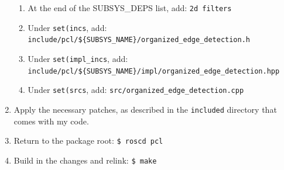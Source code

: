 \documentclass[12pt]{report}
\begin{document}
\begin{sloppypar}
\begin{enumerate}
\begin{enumerate}
\item{At the end of the SUBSYS\_DEPS list, add: \texttt{2d filters}}
\item{Under \texttt{set(incs}, add: \texttt{include\slash pcl\slash \$\{SUBSYS\_NAME\}\slash organized\_edge\_detection.h}}
\item{Under \texttt{set(impl\_incs}, add: \texttt{include\slash pcl\slash \$\{SUBSYS\_NAME\}\slash impl\slash organized\_edge\_detection.hpp}}
\item{Under \texttt{set(srcs}, add: \texttt{src/organized\_edge\_detection.cpp}}
\end{enumerate}
\item{Apply the necessary patches, as described in the \texttt{included} directory that comes with my code.}
\item{Return to the package root: \texttt{\$\ roscd pcl}}
\item{Build in the changes and relink: \texttt{\$\ make}}
\end{enumerate}
\end{sloppypar}
\end{document}
